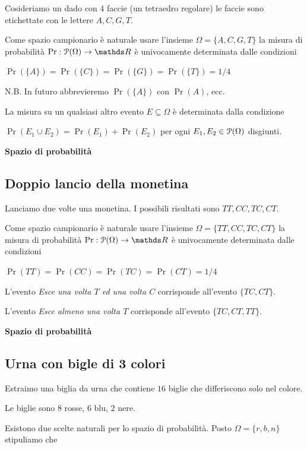 \documentclass[12pt,openany]{book}
\def\RR{\mathds R}
\def\P{\EuScript P}
\theoremstyle{mio}
\theoremstyle{liscio}
\begin{document}
Cosideriamo un dado con $4$ faccie (un tetraedro regolare) le faccie sono etichettate con le lettere $A, C, G, T$. 

Come spazio campionario è naturale usare l'insieme $\Omega=\{A,C,G,T\}$ la misura di probabilità $\Pr:\P(\Omega)\to\RR$ è univocamente determinata dalle condizioni

$\Pr(\{A\})=\Pr(\{C\})=\Pr(\{G\})=\Pr(\{T\})=1/4$

N.B. In futuro abbrevieremo $\Pr(\{A\})$ con $\Pr(A)$, ecc.

La misura su un qualsiasi altro evento $E\subseteq\Omega$ è determinata dalla condizione 

$\Pr(E_1\cup E_2)=\Pr(E_1)+\Pr(E_2)$ per ogni $E_1,E_2\in\P(\Omega)$ disgiunti.



\hfill{}\clearpage\hfill\textbf{Spazio di probabilità}
\subsection{Doppio lancio della monetina}
\label{doppo_lancio_moneta}

Lanciamo due volte una monetina. I possibili risultati sono $TT, CC, TC, CT$. 

Come spazio campionario è naturale usare l'insieme $\Omega=\{TT, CC, TC, CT\}$ la misura di probabilità $\Pr:\P(\Omega)\to\RR$ è univocamente determinata dalle condizioni

$\Pr(TT)=\Pr(CC)=\Pr(TC)=\Pr(CT)=1/4$

L'evento \textit{Esce una volta $T$ ed una volta $C$\/} corrisponde all'evento $\{TC, CT\}$.

L'evento \textit{Esce almeno una volta $T$\/} corrisponde all'evento $\{TC, CT, TT\}$.



\hfill{}\clearpage\hfill\textbf{Spazio di probabilità}
\subsection{Urna con bigle di 3 colori}
\label{urna_3_colori}

Estraimo una biglia da urna che contiene $16$ biglie che differiscono solo nel colore.

Le biglie sono $8$ rosse, $6$ blu, $2$ nere.

Esistono due scelte naturali per lo spazio di probabilità. Posto $\Omega=\{r,b,n\}$ stipuliamo che

\end{document}
